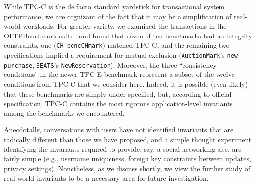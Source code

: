  While TPC-C is the de facto
standard yardstick for transactional system performance, we are
cognizant of the fact that it may be a simplification of real-world
workloads. For greater variety, we examined the transactions in the
OLTPBenchmark suite~\cite{oltpbench} and found that seven of ten
benchmarks had no integrity constraints, one (\texttt{CH-bencCHmark})
matched TPC-C, and the remaining two specifications implied a
requirement for mutual exclusion (\texttt{AuctionMark}'s
\texttt{new-purchase}, \texttt{SEATS}'s
\texttt{NewReservation}). Moreover, the three ``consistency
conditions'' in the newer TPC-E benchmark represent a subset of the
twelve conditions from TPC-C that we consider here. Indeed, it is
possible (even likely) that these benchmarks are simply
under-specified, but, according to official specification, TPC-C
contains the most rigorous application-level invariants among the
benchmarks we encountered.

Anecdotally, conversations with users have not identified invariants
that are radically different than those we have proposed, and a simple
thought experiment identifying the invariants required to provide,
say, a social networking site, are fairly simple (e.g., username
uniqueness, foreign key constraints between updates, privacy
settings). Nonetheless, as we discuss shortly, we view the further
study of real-world invariants to be a necessary area for future
investigation.


